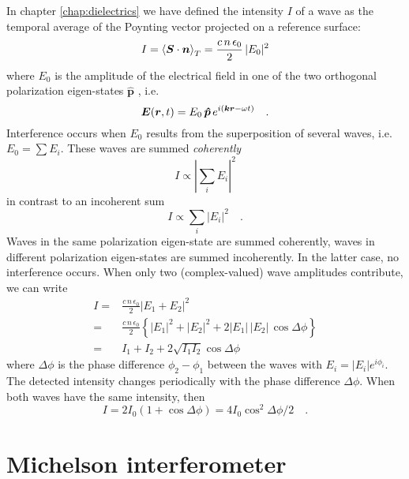 In chapter \ref{chap:dielectrics} we have defined the intensity  $I$  of a wave as the temporal average of the Poynting vector projected on a reference surface:
\begin{equation}
    I = \braket{\boldsymbol{S} \cdot \boldsymbol{n}}_T = \frac{c \, n \, \epsilon_0}{2} \, | E_0 |^2 
\end{equation}
 where  $E_0 $ is the amplitude of the electrical field in one of the two orthogonal polarization eigen-states $\boldsymbol{\hat{p}}$ , i.e.
\begin{equation}
  \boldsymbol{E}(\boldsymbol{r}, t) = E_0 \, \boldsymbol{\hat{p}} \, e^{i (\boldsymbol{k} \boldsymbol{r} - \omega t)}  \quad .
\end{equation}
Interference occurs when $E_0$ results from the superposition of several waves, i.e. $E_0 = \sum E_i$. These waves are summed \emph{coherently}
\begin{equation}
  I \propto \left| \sum_i E_i \right|^2 
\end{equation} 
in contrast to an incoherent sum
\begin{equation}
  I \propto \sum_i \left|  E_i \right|^2  \quad .
\end{equation} 
Waves in the same polarization eigen-state are summed coherently, waves in different polarization eigen-states are summed incoherently. In the latter case, no interference occurs.
When only two (complex-valued) wave amplitudes contribute, we can write 
\begin{align}
  I =  & \frac{c \, n \, \epsilon_0}{2} \left| E_1 + E_2 \right|^2 \\
  =  & \frac{c \, n \, \epsilon_0}{2}  \left\{
  |E_1|^2 +  |E_2|^2 + 2 |E_1| \, |E_2| \, \cos \Delta \phi
  \right\} \\
  = & I_1 + I_2 + 2 \sqrt{I_1 I_2} \cos \Delta \phi
\end{align} 
where $\Delta \phi$ is the phase difference $\phi_2 - \phi_1$ between the waves with $E_i = |E_i| e^{i \phi_i}$. The detected intensity changes periodically with the phase difference  $\Delta \phi$. When both waves have the same intensity, then 
\begin{equation}
  I = 2 I_0 (1 + \cos \Delta \phi ) = 4 I_0 \cos^2 \Delta \phi /2  \quad .
\end{equation}


\section{Michelson interferometer}

